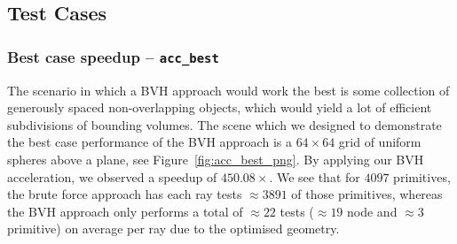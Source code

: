 \documentclass{article}
\begin{document}
\subsection{Test Cases}

\begin{table}[htbp]
\centering
\caption{Acceleration benchmark (render time only, 4 threads).}
\label{tab:accel_benchmark}
\footnotesize
\setlength{\tabcolsep}{4pt}
\end{table}

\subsubsection{Best case speedup -- \texttt{acc\_best}}
The scenario in which a BVH approach would work the best is some collection of generously spaced non-overlapping objects, which would yield a lot of efficient subdivisions of bounding volumes. The scene which we designed to demonstrate the best case performance of the BVH approach is a $64 \times 64$ grid of uniform spheres above a plane, see Figure~\ref{fig:acc_best_png}. By applying our BVH acceleration, we observed a speedup of $450.08 \times$. We see that for $4097$ primitives, the brute force approach has each ray tests $\approx 3891$ of those primitives, whereas the BVH approach only performs a total of $\approx 22$ tests ($\approx 19$ node and $\approx 3$ primitive) on average per ray due to the optimised geometry.
\end{document}
